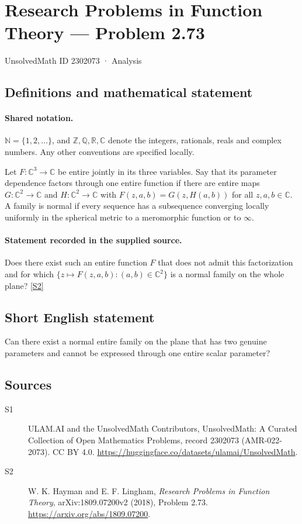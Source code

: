 \documentclass[11pt]{article}
\newcommand{\sref}[2]{\hyperlink{source:#1:#2}{[S#2]}}
\begin{document}
\setcounter{section}{2302072}
\section{Research Problems in Function Theory — Problem 2.73}\label{2302073}
{\small\sffamily UnsolvedMath ID 2302073 · Analysis}
\subsection{Definitions and mathematical statement}

\paragraph{Shared notation.}$\mathbb N=\{1,2,\ldots\}$, and $\mathbb Z,\mathbb Q,\mathbb R,\mathbb C$ denote the integers, rationals, reals and complex numbers. Any other conventions are specified locally.


Let $F:\mathbb C^3\to\mathbb C$ be entire jointly in its three variables. Say that its parameter dependence factors through one entire function if there are entire maps $G:\mathbb C^2\to\mathbb C$ and $H:\mathbb C^2\to\mathbb C$ with $F(z,a,b)=G(z,H(a,b))$ for all $z,a,b\in\mathbb C$. A family is normal if every sequence has a subsequence converging locally uniformly in the spherical metric to a meromorphic function or to $\infty$.
\paragraph{Statement recorded in the supplied source.}
Does there exist such an entire function $F$ that does not admit this factorization and for which $\{z\mapsto F(z,a,b):(a,b)\in\mathbb C^2\}$ is a normal family on the whole plane? \sref{2302073}{2}
\subsection{Short English statement}
Can there exist a normal entire family on the plane that has two genuine parameters and cannot be expressed through one entire scalar parameter?
\subsection{Sources}
\begin{description}
\item[\hypertarget{source:2302073:1}{S1}] ULAM.AI and the UnsolvedMath Contributors, UnsolvedMath: A Curated Collection of Open Mathematics Problems, record 2302073 (AMR-022-2073). CC BY 4.0. \url{https://huggingface.co/datasets/ulamai/UnsolvedMath}.
\item[\hypertarget{source:2302073:2}{S2}] W. K. Hayman and E. F. Lingham, \emph{Research Problems in Function Theory}, arXiv:1809.07200v2 (2018), Problem 2.73. \url{https://arxiv.org/abs/1809.07200}.
\end{description}
\label{end:2302073}
\end{document}
